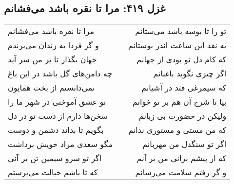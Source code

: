 \begin{center}
\section*{غزل ۴۱۹: مرا تا نقره باشد می‌فشانم}
\label{sec:419}
\begin{longtable}{l p{0.5cm} r}
مرا تا نقره باشد می‌فشانم
&&
تو را تا بوسه باشد می‌ستانم
\\
و گر فردا به زندان می‌برندم
&&
به نقد این ساعت اندر بوستانم
\\
جهان بگذار تا بر من سر آید
&&
که کام دل تو بودی از جهانم
\\
چه دامن‌های گل باشد در این باغ
&&
اگر چیزی نگوید باغبانم
\\
نمی‌دانستم از بخت همایون
&&
که سیمرغی فتد در آشیانم
\\
تو عشق آموختی در شهر ما را
&&
بیا تا شرح آن هم بر تو خوانم
\\
سخن‌ها دارم از دست تو در دل
&&
ولیکن در حضورت بی زبانم
\\
بگویم تا بداند دشمن و دوست
&&
که من مستی و مستوری ندانم
\\
مگو سعدی مراد خویش برداشت
&&
اگر تو سنگدل من مهربانم
\\
اگر تو سرو سیمین تن بر آنی
&&
که از پیشم برانی من بر آنم
\\
که تا باشم خیالت می‌پرستم
&&
و گر رفتم سلامت می‌رسانم
\\
\end{longtable}
\end{center}
